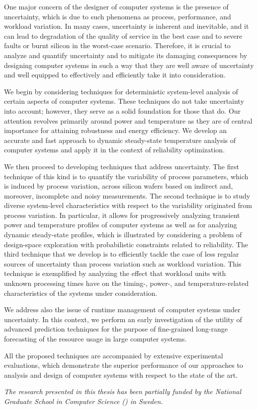 One major concern of the designer of computer systems is the presence of
uncertainty, which is due to such phenomena as process, performance, and
workload variation. In many cases, uncertainty is inherent and inevitable, and
it can lead to degradation of the quality of service in the best case and to
severe faults or burnt silicon in the worst-case scenario. Therefore, it is
crucial to analyze and quantify uncertainty and to mitigate its damaging
consequences by designing computer systems in such a way that they are well
aware of uncertainty and well equipped to effectively and efficiently take it
into consideration.

We begin by considering techniques for deterministic system-level analysis of
certain aspects of computer systems. These techniques do not take uncertainty
into account; however, they serve as a solid foundation for those that do. Our
attention revolves primarily around power and temperature as they are of central
importance for attaining robustness and energy efficiency. We develop an
accurate and fast approach to dynamic steady-state temperature analysis of
computer systems and apply it in the context of reliability optimization.

We then proceed to developing techniques that address uncertainty. The first
technique of this kind is to quantify the variability of process parameters,
which is induced by process variation, across silicon wafers based on indirect
and, moreover, incomplete and noisy measurements. The second technique is to
study diverse system-level characteristics with respect to the variability
originated from process variation. In particular, it allows for progressively
analyzing transient power and temperature profiles of computer systems as well
as for analyzing dynamic steady-state profiles, which is illustrated by
considering a problem of design-space exploration with probabilistic constraints
related to reliability. The third technique that we develop is to efficiently
tackle the case of less regular sources of uncertainty than process variation
such as workload variation. This technique is exemplified by analyzing the
effect that workload units with unknown processing times have on the timing-,
power-, and temperature-related characteristics of the systems under
consideration.

We address also the issue of runtime management of computer systems under
uncertainty. In this context, we perform an early investigation of the utility
of advanced prediction techniques for the purpose of fine-grained long-range
forecasting of the resource usage in large computer systems.

All the proposed techniques are accompanied by extensive experimental
evaluations, which demonstrate the superior performance of our approaches to
analysis and design of computer systems with respect to the state of the art.

\vspace{1em}
\noindent
\emph{The research presented in this thesis has been partially funded by the
National Graduate School in Computer Science () in Sweden.}
